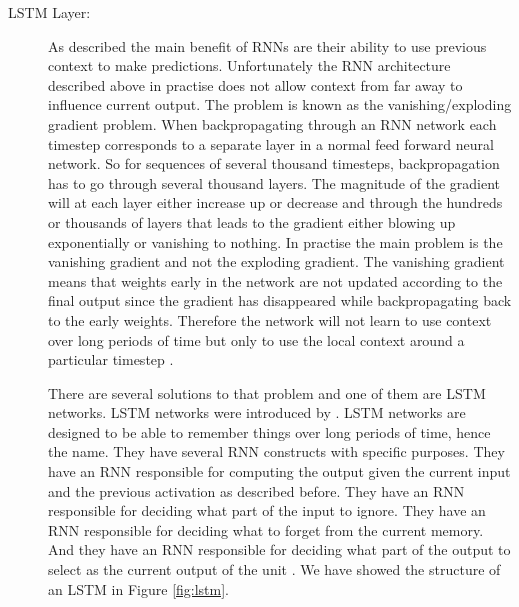 \begin{description}
    \item[\gls{LSTM} Layer:]
        \label{layer:LSTM}

        As described the main benefit of \glspl{RNN} are their ability to use
        previous context to make predictions. Unfortunately the \gls{RNN}
        architecture described above in practise does not allow context from
        far away to influence current output. The problem is known as the
        vanishing/exploding gradient problem. When backpropagating through an
        \gls{RNN} network each timestep corresponds to a separate layer in a
        normal feed forward neural network. So for sequences of several thousand
        timesteps, backpropagation has to go through several thousand layers.
        The magnitude of the gradient will at each layer either increase up or
        decrease and through the hundreds or thousands of layers that leads to
        the gradient either blowing up exponentially or vanishing to nothing.
        In practise the main problem is the vanishing gradient and not the
        exploding gradient. The vanishing gradient means that weights early
        in the network are not updated according to the final output since
        the gradient has disappeared while backpropagating back to the early
        weights. Therefore the network will not learn to use context over long
        periods of time but only to use the local context around a particular
        timestep \citep{DBLP:series/sci/2012-385}.

        There are several solutions to that problem and one of them are
        \gls{LSTM} networks. \gls{LSTM} networks were introduced by
        \citet{Hochreiter:1997:LSM:1246443.1246450}. \gls{LSTM} networks are
        designed to be able to remember things over long periods of time, hence
        the name. They have several \gls{RNN} constructs with specific purposes.
        They have an \gls{RNN} responsible for computing the output given the
        current input and the previous activation as described before. They have
        an \gls{RNN} responsible for deciding what part of the input to ignore.
        They have an \gls{RNN} responsible for deciding what to forget from the
        current memory. And they have an \gls{RNN} responsible for deciding
        what part of the output to select as the current output of the unit
        \citep{DBLP:series/sci/2012-385}. We have showed the structure of an
        \gls{LSTM} in Figure \ref{fig:lstm}.


\end{description}
